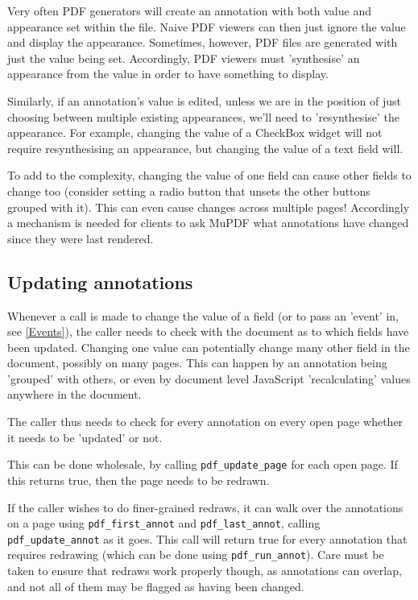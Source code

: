 \documentclass[oneside]{book}
\begin{document}
Very often PDF generators will create an annotation with both value and appearance set within the file. Naive PDF viewers can then just ignore the value and display the appearance. Sometimes, however, PDF files are generated with just the value being set. Accordingly, PDF viewers must 'synthesise' an appearance from the value in order to have something to display.

Similarly, if an annotation's value is edited, unless we are in the position of just choosing between multiple existing appearances, we'll need to 'resynthesise' the appearance. For example, changing the value of a CheckBox widget will not require resynthesising an appearance, but changing the value of a text field will.

To add to the complexity, changing the value of one field can cause other fields to change too (consider setting a radio button that unsets the other buttons grouped with it). This can even cause changes across multiple pages! Accordingly a mechanism is needed for clients to ask MuPDF what annotations have changed since they were last rendered.

\subsection{Updating annotations}

Whenever a call is made to change the value of a field (or to pass an 'event' in, see \ref{Events}), the caller needs to check with the document as to which fields have been updated. Changing one value can potentially change many other field in the document, possibly on many pages. This can happen by an annotation being 'grouped' with others, or even by document level JavaScript 'recalculating' values anywhere in the document.

The caller thus needs to check for every annotation on every open page whether it needs to be 'updated' or not.

This can be done wholesale, by calling \texttt{pdf\_update\_page} for each open page. If this returns true, then the page needs to be redrawn.

If the caller wishes to do finer-grained redraws, it can walk over the annotations on a page using \texttt{pdf\_first\_annot} and \texttt{pdf\_last\_annot}, calling \texttt{pdf\_update\_annot} as it goes. This call will return true for every annotation that requires redrawing (which can be done using \texttt{pdf\_run\_annot}). Care must be taken to ensure that redraws work properly though, as annotations can overlap, and not all of them may be flagged as having been changed.
\end{document}
